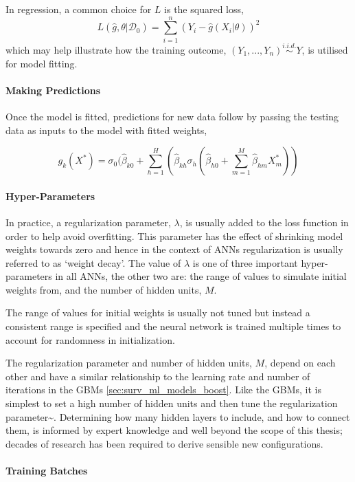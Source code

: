 \documentclass[
  letterpaper,
]{scrbook}
\let\oldparagraph\paragraph
\renewcommand{\paragraph}[1]{\oldparagraph{#1}\mbox{}}
\theoremstyle{plain}
\theoremstyle{definition}
\theoremstyle{remark}
\begin{document}
In regression, a common choice for \(L\) is the squared loss, \[
L(\hat{g}, \theta|\mathcal{D}_0) = \sum_{i=1}^n (Y_i - \hat{g}(X_i|\theta))^2
\] which may help illustrate how the training outcome,
\((Y_1,...,Y_n) \stackrel{i.i.d.}\sim Y\), is utilised for model
fitting.

\paragraph{Making Predictions}

Once the model is fitted, predictions for new data follow by passing the
testing data as inputs to the model with fitted weights,

\[
g_k(X^*) = \sigma_0(\hat{\beta}_{k0} + \sum_{h=1}^H (\hat{\beta}_{kh}\sigma_h (\hat{\beta}_{h0} + \sum^M_{m=1} \hat{\beta}_{hm}X^*_m))
\]

\paragraph{Hyper-Parameters}

In practice, a regularization parameter, \(\lambda\), is usually added
to the loss function in order to help avoid overfitting. This parameter
has the effect of shrinking model weights towards zero and hence in the
context of ANNs regularization is usually referred to as `weight decay'.
The value of \(\lambda\) is one of three important hyper-parameters in
all ANNs, the other two are: the range of values to simulate initial
weights from, and the number of hidden units, \(M\).

The range of values for initial weights is usually not tuned but instead
a consistent range is specified and the neural network is trained
multiple times to account for randomness in initialization.

The regularization parameter and number of hidden units, \(M\), depend
on each other and have a similar relationship to the learning rate and
number of iterations in the GBMs \ref{sec:surv_ml_models_boost}. Like
the GBMs, it is simplest to set a high number of hidden units and then
tune the regularization
parameter\textasciitilde{}\cite{Bishop2006, Hastie2001}. Determining how
many hidden layers to include, and how to connect them, is informed by
expert knowledge and well beyond the scope of this thesis; decades of
research has been required to derive sensible new configurations.

\paragraph{Training Batches}
\end{document}
